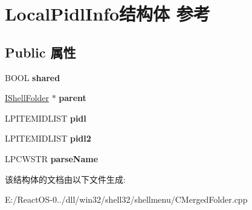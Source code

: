 \hypertarget{struct_local_pidl_info}{}\section{Local\+Pidl\+Info结构体 参考}
\label{struct_local_pidl_info}
\subsection*{Public 属性}
\begin{DoxyCompactItemize}
\item 
\mbox{\label{struct_local_pidl_info_a427a88c29739ef113f0e421f62d91b9e}} 
B\+O\+OL {\bfseries shared}
\item 
\mbox{\label{struct_local_pidl_info_ad3309f9cae0cd462dad5f6adae590ef6}} 
\hyperlink{interface_i_shell_folder}{I\+Shell\+Folder} $\ast$ {\bfseries parent}
\item 
\mbox{\label{struct_local_pidl_info_a7176ee377b507c04faf22f8081978bdb}} 
L\+P\+I\+T\+E\+M\+I\+D\+L\+I\+ST {\bfseries pidl}
\item 
\mbox{\label{struct_local_pidl_info_a7d733c8e4cf55dedf01fb4dfe659918c}} 
L\+P\+I\+T\+E\+M\+I\+D\+L\+I\+ST {\bfseries pidl2}
\item 
\mbox{\label{struct_local_pidl_info_a7db503b1b5ac933aa8291ce306f3ef29}} 
L\+P\+C\+W\+S\+TR {\bfseries parse\+Name}
\end{DoxyCompactItemize}


该结构体的文档由以下文件生成\+:\begin{DoxyCompactItemize}
\item 
E\+:/\+React\+O\+S-\/0../dll/win32/shell32/shellmenu/C\+Merged\+Folder.\+cpp\end{DoxyCompactItemize}
